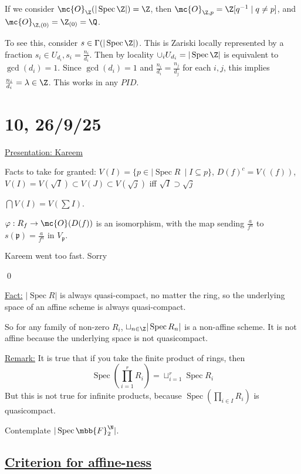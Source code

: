\documentclass[x11names,reqno,14pt]{extarticle}
\newcommand{\mk}[1]{\mathfrak{#1}}
\DeclareMathOperator{\Spec}{Spec}
\begin{document}
\begin{enumerate}
If we consider $\mc{O}_\Z(|\Spec\Z|) = \Z$, then $\mc{O}_{\Z,p} = \Z[q^{-1} \mid q \neq p]$, and $\mc{O}_{\Z,(0)} = \Z_{(0)} = \Q$. 

To see this, consider $s \in \Gamma(|\Spec \Z|)$. This is Zariski locally represented by a fraction $s_i \in U_{d_i}, s_i = \frac{n_i}{d_i}$. Then by locality $\cup_i U_{d_i} = |\Spec \Z|$ is equivalent to $\gcd(d_i) = 1$. Since $\gcd(d_i) = 1$ and $\frac{n_i}{d_i} = \frac{n_j}{d_j}$ for each $i, j$, this implies $\frac{n_i}{d_i} = \lambda\in\Z$. This works in any $PID$. 

\end{enumerate}

\section*{10, 26/9/25}

\underline{Presentation: Kareem}

Facts to take for granted: $V(I) = \{p \in |\Spec R\ \mid I \subseteq p\}$, $D(f)^c = V\left((f)\right)$, $V(I) = V(\sqrt{I}) \subset V(J) \subset V(\sqrt{j})$ iff $\sqrt{I} \supset \sqrt{j}$

$\bigcap V(I) = V(\sum I)$. 

\claim

$\varphi: R_f \to \mc{O}(D(f))$ is an isomorphism, with the map sending $\frac{a}{f^n}$ to $s(\mk{p}) = \frac{a}{f^n}$ in $V_\mk{p}$. 

\proof

Kareem went too fast. Sorry

\qed

\underline{Fact:} $|\Spec R|$ is always quasi-compact, no matter the ring, so the underlying space of an affine scheme is always quasi-compact. 

So for any family of non-zero $R_i$, $\sqcup_{n\in\Z}|\Spec R_n|$ is a non-affine scheme. It is not affine because the underlying space is not quasicompact. 

\underline{Remark:} It is true that if you take the finite product of rings, then 
\[
\Spec \left(\prod_{i=1}^r R_i\right) = \sqcup_{i=1}^r \Spec R_i
\]
But this is not true for infinite products, because $\Spec\left(\prod_{i\in I} R_i\right)$ is quasicompact. 

Contemplate $|\Spec \mbb{F}_2^\N|$.

\subsection*{\underline{Criterion for affine-ness}}
\end{document}
